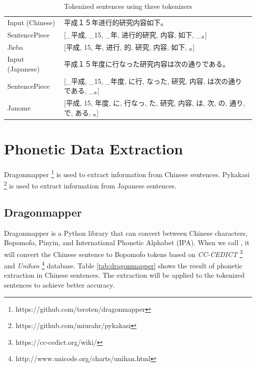 \vspace{0.4cm}
\begin{CJK}{UTF8}{gbsn}
    \begin{table}[h]
        \centering
        \begin{tabularx}{\textwidth}{lb}\toprule
            Input (Chinese) & 平成１５年进行的研究内容如下。\\
            SentencePiece & [\_平成, \_15, \_年, 进行的研究, 内容, 如下, \_。] \\
            Jieba & [平成, 15, 年, 进行, 的, 研究, 内容, 如下, 。] \\\midrule
            Input (Japanese) & 平成１５年度に行なった研究内容は次の通りである。 \\
            SentencePiece & [\_平成, \_15, \_年度, に行, なった, 研究, 内容, は次の通りである, \_。] \\
            Janome & [平成, 15, 年度, に, 行なっ, た, 研究, 内容, は, 次, の, 通り, で, ある, 。] \\
            \bottomrule
        \end{tabularx}
        \caption{Tokenized sentences using three tokenizers}
        \label{tab:tokenized_sentences}
    \end{table}
\end{CJK}

\newpage

\section{Phonetic Data Extraction} \label{sec:phonetic_data}

Dragonmapper \footnote{https://github.com/tsroten/dragonmapper} is used to extract information from Chinese sentences. Pykakasi \footnote{https://github.com/miurahr/pykakasi} is used to extract information from Japanese sentences.

\subsection{Dragonmapper} \label{sec:dragonmapper}

Dragonmapper is a Python library that can convert between Chinese characters, Bopomofo, Pinyin, and International Phonetic Alphabet (IPA). When we call , it will convert the Chinese sentence to Bopomofo tokens based on \textit{CC-CEDICT} \footnote{https://cc-cedict.org/wiki/} and \textit{Unihan} \footnote{http://www.unicode.org/charts/unihan.html} database. Table \ref{tab:dragonmapper} shows the result of phonetic extraction in Chinese sentences. The extraction will be applied to the tokenized sentences to achieve better accuracy.

